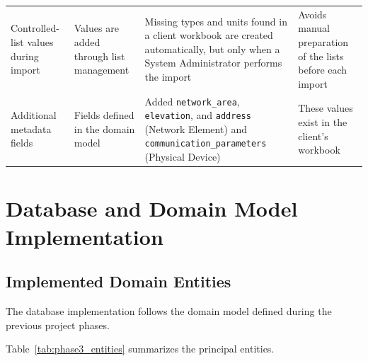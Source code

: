 \documentclass[11pt,a4paper]{article}
\begin{document}
\begin{longtable}{P{2.7cm} P{4.2cm} P{4.6cm} P{3.7cm}}
Controlled-list values during import &
Values are added through list management &
Missing types and units found in a client workbook are created
automatically, but only when a System Administrator performs the import &
Avoids manual preparation of the lists before each import \\

Additional metadata fields &
Fields defined in the domain model &
Added \texttt{network\_area}, \texttt{elevation}, and \texttt{address}
(Network Element) and \texttt{communication\_parameters}
(Physical Device) &
These values exist in the client's workbook \\

\end{longtable}


\section{Database and Domain Model Implementation}

\subsection{Implemented Domain Entities}

The database implementation follows the domain model
defined during the previous project phases.

Table~\ref{tab:phase3_entities} summarizes the
principal entities.
\end{document}
